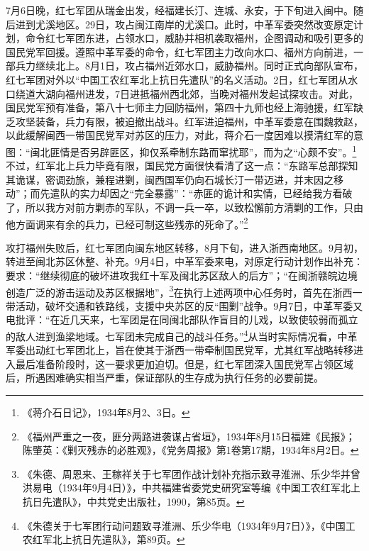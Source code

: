 7月6日晚，红七军团从瑞金出发，经福建长汀、连城、永安，于下旬进入闽中。随后进到尤溪地区。29日，攻占闽江南岸的尤溪口。此时，中革军委突然改变原定计划，命令红七军团东进，占领水口，威胁并相机袭取福州，企图调动和吸引更多的国民党军回援。遵照中革军委的命令，红七军团主力改向水口、福州方向前进，一部兵力继续北上。8月1日，攻占福州近郊水口，威胁福州。同时正式向部队宣布，红七军团对外以“中国工农红军北上抗日先遣队”的名义活动。2日，红七军团从水口绕道大湖向福州进发，7日进抵福州西北郊，当晚对福州发起试探攻击。对此，国民党军预有准备，第八十七师主力回防福州，第四十九师也经上海驰援，红军缺乏攻坚装备，兵力有限，被迫撤出战斗。红军进迫福州，中革军委意在围魏救赵，以此缓解闽西一带国民党军对苏区的压力，对此，蒋介石一度因难以摸清红军的意图：“闽北匪情是否另辟匪区，抑仅系牵制东路而窜扰耶”，而为之“心颇不安”。\footnote{《蒋介石日记》，1934年8月2、3日。}不过，红军北上兵力毕竟有限，国民党方面很快看清了这一点：“东路军总部探知其诡谋，密调劲旅，兼程进剿，闽西国军仍向石城长汀一带迈进，并末因之移动”；而先遣队的实力却因之“完全暴露”：“赤匪的诡计和实情，已经给我方看破了，所以我方对前方剿赤的军队，不调一兵一卒，以致松懈前方清剿的工作，只由他方面调来有余的兵力，已经可制这些残赤的死命了。”\footnote{《福州严重之一夜，匪分两路进袭谋占省垣》，1934年8月15日福建《民报》；陈肇英：《剿灭残赤的必胜观》，《党务周报》第1卷第17期，1934年8月2日。}


攻打福州失败后，红七军团向闽东地区转移，8月下旬，进入浙西南地区。9月初，转进至闽北苏区休整、补充。9月4日，中革军委来电，对原定行动计划作出补充：要求：“继续彻底的破坏进攻我红十军及闽北苏区敌人的后方”；“在闽浙赣皖边境创造广泛的游击运动及苏区根据地”，\footnote{《朱德、周恩来、王稼祥关于七军团作战计划补充指示致寻淮洲、乐少华并曾洪易电（1934年9月4日）》，中共福建省委党史研究室等编《中国工农红军北上抗日先遣队》，中共党史出版社，1990，第85页。}在执行上述两项中心任务时，首先在浙西一带活动，破坏交通和铁路线，支援中央苏区的反“围剿”战争。9月7日，中革军委又电批评：“在近几天来，七军团是在同闽北部队作盲目的儿戏，以致使较弱而孤立的敌人进到渔梁地域。七军团未完成自己的战斗任务。”\footnote{《朱德关于七军团行动问题致寻淮洲、乐少华电（1934年9月7日）》，《中国工农红军北上抗日先遣队》，第89页。}从当时实际情况看，中革军委出动红七军团北上，旨在使其于浙西一带牵制国民党军，尤其红军战略转移进入最后准备阶段时，这一要求更加迫切。但是，红七军团深入国民党军占领区域后，所遇困难确实相当严重，保证部队的生存成为执行任务的必要前提。


